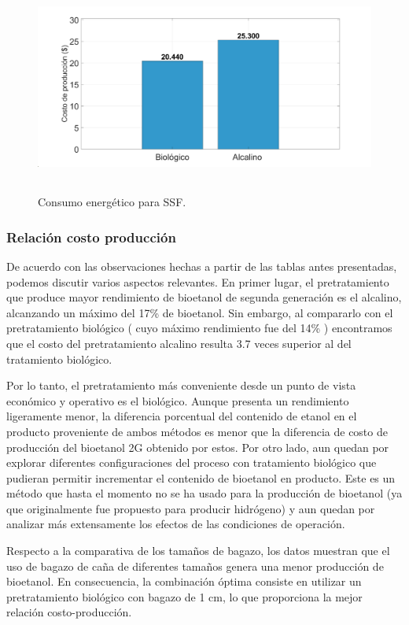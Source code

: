 \documentclass[12pt]{article}
\begin{document}
\begin{figure} [H]
	\centering
	\includegraphics[width=16cm, height=7cm]{imagenes/costos}
	\caption{Consumo energético para SSF. }
	\label{grafica}
\end{figure}
\subsubsection{Relación costo producción}
De acuerdo con las observaciones hechas a partir de las tablas antes presentadas, podemos discutir varios aspectos relevantes. En primer lugar, el pretratamiento que produce mayor rendimiento de bioetanol de segunda generación es el alcalino, alcanzando un máximo del 17\% de bioetanol. Sin embargo, al compararlo con el pretratamiento biológico ( cuyo máximo rendimiento fue del 14\% ) encontramos que el costo del pretratamiento alcalino resulta 3.7 veces superior al del tratamiento biológico.

Por lo tanto, el pretratamiento más conveniente desde un punto de vista económico y operativo es el biológico. Aunque presenta un rendimiento ligeramente menor, la diferencia porcentual del contenido de etanol en el producto proveniente de ambos métodos es menor que la diferencia de costo de producción del bioetanol 2G obtenido por estos. Por otro lado, aun quedan por explorar diferentes configuraciones del proceso con tratamiento biológico que pudieran permitir incrementar el contenido de bioetanol en producto. Este es un método que hasta el momento no se ha usado para la producción de bioetanol (ya que originalmente fue propuesto para producir hidrógeno) y aun quedan por analizar más extensamente los efectos de las condiciones de operación.

Respecto a la comparativa de los tamaños de bagazo, los datos muestran que el uso de bagazo de caña de diferentes tamaños genera una menor producción de bioetanol. En consecuencia, la combinación óptima consiste en utilizar un pretratamiento biológico con bagazo de 1 cm, lo que proporciona la mejor relación costo-producción.
\end{document}

